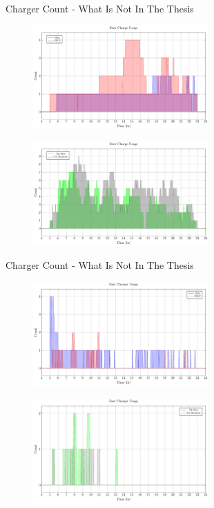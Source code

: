 \documentclass[bigger]{beamer}
\begin{document}
\begin{frame}[label={sec:org33f5370}]{Charger Count - What Is Not In The Thesis}
\begin{figure}[htpb]
\centering
    \includegraphics[width=0.6\textwidth]{img/sa-pap-paper-good/charger-count-slow-milp-qin}
\end{figure}
\begin{figure}[htpb]
\centering
    \includegraphics[width=0.6\textwidth]{img/sa-pap-paper-good/charger-count-slow-sa}
\end{figure}
\end{frame}

\begin{frame}[label={sec:org74d020d}]{Charger Count - What Is Not In The Thesis}
\begin{figure}[htpb]
\centering
    \includegraphics[width=0.6\textwidth]{img/sa-pap-paper-good/charger-count-fast-milp-qin}
\end{figure}
\begin{figure}[htpb]
\centering
    \includegraphics[width=0.6\textwidth]{img/sa-pap-paper-good/charger-count-fast-sa}
\end{figure}
\end{frame}
\end{document}
